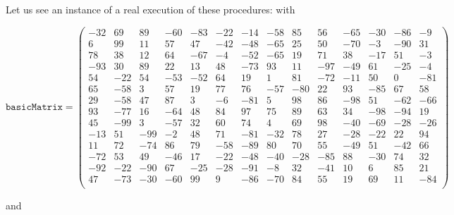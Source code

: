 \documentclass[12pt]{article}
\begin{document}
Let us see an instance of a real execution of these procedures: with\par\nobreak
\begin{scriptsize}
\[
  \texttt{basicMatrix} =
  \left(
\begin{array}{rrrrrrrrrrrrrr}
 -32 & 69 & 89 & -60 & -83 & -22 & -14 & -58 & 85 & 56 & -65 & -30 & -86 & -9 \\
 6 & 99 & 11 & 57 & 47 & -42 & -48 & -65 & 25 & 50 & -70 & -3 & -90 & 31 \\
 78 & 38 & 12 & 64 & -67 & -4 & -52 & -65 & 19 & 71 & 38 & -17 & 51 & -3 \\
 -93 & 30 & 89 & 22 & 13 & 48 & -73 & 93 & 11 & -97 & -49 & 61 & -25 & -4 \\
 54 & -22 & 54 & -53 & -52 & 64 & 19 & 1 & 81 & -72 & -11 & 50 & 0 & -81 \\
 65 & -58 & 3 & 57 & 19 & 77 & 76 & -57 & -80 & 22 & 93 & -85 & 67 & 58 \\
 29 & -58 & 47 & 87 & 3 & -6 & -81 & 5 & 98 & 86 & -98 & 51 & -62 & -66 \\
 93 & -77 & 16 & -64 & 48 & 84 & 97 & 75 & 89 & 63 & 34 & -98 & -94 & 19 \\
 45 & -99 & 3 & -57 & 32 & 60 & 74 & 4 & 69 & 98 & -40 & -69 & -28 & -26 \\
 -13 & 51 & -99 & -2 & 48 & 71 & -81 & -32 & 78 & 27 & -28 & -22 & 22 & 94 \\
 11 & 72 & -74 & 86 & 79 & -58 & -89 & 80 & 70 & 55 & -49 & 51 & -42 & 66 \\
 -72 & 53 & 49 & -46 & 17 & -22 & -48 & -40 & -28 & -85 & 88 & -30 & 74 & 32 \\
 -92 & -22 & -90 & 67 & -25 & -28 & -91 & -8 & 32 & -41 & 10 & 6 & 85 & 21 \\
 47 & -73 & -30 & -60 & 99 & 9 & -86 & -70 & 84 & 55 & 19 & 69 & 11 & -84 \\
\end{array}
\right)
\]
\end{scriptsize}%
and
\end{document}
